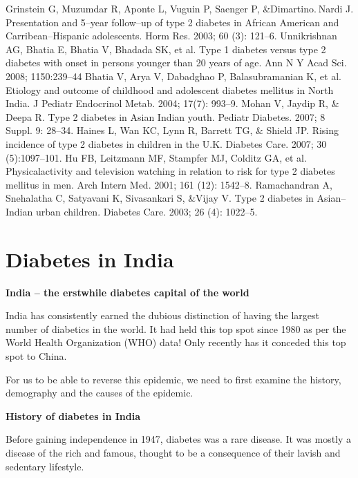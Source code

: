 \begin{thebibliography}{99}
 Grinstein G, Muzumdar R, Aponte L, Vuguin P, Saenger P, \&\break Dimartino. Nardi J. Presentation and 5–year follow–up of type 2 diabetes in African American and Carribean–Hispanic adole\-scents. Horm Res. 2003; 60 (3): 121–6.
  Unnikrishnan AG, Bhatia E, Bhatia V, Bhadada SK, et al. Type 1 dia\-betes versus type 2 diabetes with onset in persons younger than 20 years of age. Ann N Y Acad Sci. 2008; 1150:239–44
  Bhatia V, Arya V, Dabadghao P, Balasubramanian K, et al. Etio\-logy and outcome of childhood and adolescent diabetes mellitus in North India. J Pediatr Endocrinol Metab. 2004; 17(7): 993–9.
  Mohan V, Jaydip R, \& Deepa R. Type 2 diabetes in Asian Indian youth. Pediatr Diabetes. 2007; 8 Suppl. 9: 28–34.
  Haines L, Wan KC, Lynn R, Barrett TG, \& Shield JP. Rising incidence of type 2 diabetes in children in the U.K. Diabetes Care. 2007; 30 (5):1097–101.
  Hu FB, Leitzmann MF, Stampfer MJ, Colditz GA, et al. Physical\break activity and television watching in relation to risk for type 2 diabetes mellitus in men. Arch Intern Med. 2001; 161 (12): 1542–8.
  Ramachandran A, Snehalatha C, Satyavani K, Sivasankari S, \&\break Vijay V. Type 2 diabetes in Asian–Indian urban children. Diabetes Care. 2003; 26 (4): 1022–5.
 \end{thebibliography}


\chapter{Diabetes in India}\label{chap8}

\noindent\textbf{India – the erstwhile diabetes capital of the world}

India has consistently earned the dubious distinction of having the largest number of diabetics in the world. It had held this top spot since 1980 as per the World Health Organization (WHO) data! Only recently has it conceded this top spot to China.

For us to be able to reverse this epidemic, we need to first examine the history, demography and the causes of the epidemic.

\noindent\textbf{History of diabetes in India}

Before gaining independence in 1947, diabetes was a rare disease. It was mostly a disease of the rich and famous, thought to be a con\-sequence of their lavish and sedentary lifestyle.

